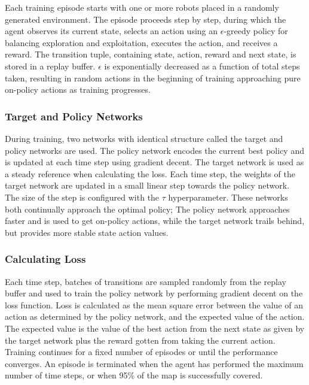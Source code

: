 Each training episode starts with one or more robots placed in a randomly generated environment. The episode proceeds step by step, during which the agent observes its current state, selects an action using an $\epsilon$-greedy policy for balancing exploration and exploitation, executes the action, and receives a reward. The transition tuple, containing state, action, reward and next state, is stored in a replay buffer. $\epsilon$ is exponentially decreased as a function of total steps taken, resulting in random actions in the beginning of training approaching pure on-policy actions as training progresses. \\

\subsubsection{Target and Policy Networks}
During training, two networks with identical structure called the target and policy networks are used. The policy network encodes the current best policy and is updated at each time step using gradient decent. The target network is used as a steady reference when calculating the loss. Each time step, the weights of the target network are updated in a small linear step towards the policy network. The size of the step is configured with the $\tau$ hyperparameter. These networks both continually approach the optimal policy; The policy network approaches faster and is used to get on-policy actions, while the target network trails behind, but provides more stable state action values.

\subsubsection{Calculating Loss}
Each time step, batches of transitions are sampled randomly from the replay buffer and used to train the policy network by performing gradient decent on the loss function. Loss is calculated as the mean square error between the value of an action as determined by the policy network, and the expected value of the action. The expected value is the value of the best action from the next state as given by the target network plus the reward gotten from taking the current action. \\


Training continues for a fixed number of episodes or until the performance converges. An episode is terminated when the agent has performed the maximum number of time steps, or when 95\% of the map is successfully covered.

